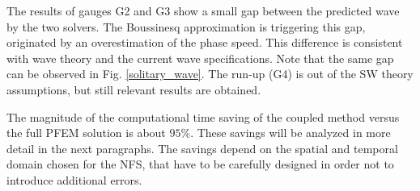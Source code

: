 The results of gauges G2 and G3 show a small gap between the predicted wave by the two solvers. The Boussinesq approximation is triggering this gap, originated by an overestimation of the phase speed. This difference is consistent with wave theory and the current wave specifications. Note that the same gap can be observed in Fig. \ref{solitary_wave}.
The run-up (G4) is out of the SW theory assumptions, but still relevant results are obtained.

The magnitude of the computational time saving of the coupled method versus the full PFEM solution is about $95\%$. These savings will be analyzed in more detail in the next paragraphs. The savings depend on the spatial and temporal domain chosen for the NFS, that have to be carefully designed in order not to introduce additional errors.








